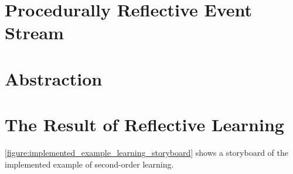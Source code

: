 \section{Procedurally Reflective Event Stream}



\section{Abstraction}



\section{The Result of Reflective Learning}

{\mbox{\autoref{figure:implemented_example_learning_storyboard}}}
shows a storyboard of the implemented example of second-order
learning.
